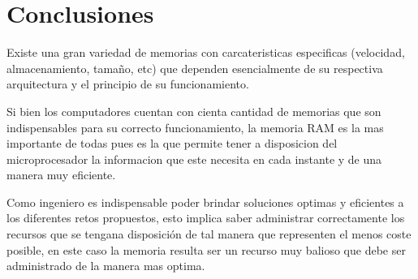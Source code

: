 \documentclass{article}
\begin{document}
\section{Conclusiones} \label{contenido}

Existe una gran variedad de memorias con carcateristicas especificas (velocidad, almacenamiento, tamaño, etc) que dependen esencialmente de su respectiva arquitectura y el principio de su funcionamiento.

Si bien los computadores cuentan con cienta cantidad de memorias que son indispensables para su correcto funcionamiento, la memoria RAM es la mas importante de todas pues es la que permite tener a disposicion del microprocesador la informacion que este necesita en cada instante y de una manera muy eficiente.

Como ingeniero es indispensable poder brindar soluciones optimas y eficientes a los diferentes retos propuestos, esto implica saber administrar correctamente los recursos que se tengana disposición de tal manera que representen el menos coste posible, en este caso la memoria resulta ser un recurso muy balioso que debe ser administrado de la manera mas optima.
\end{document}
